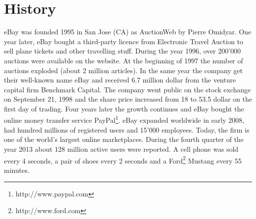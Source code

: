 \section{History}
eBay was founded 1995 in San Jose (CA) as AuctionWeb by Pierre Omidyar. One year later, eBay bought a third-party licence from Electronic Travel Auction to sell plane tickets and other travelling stuff. During the year 1996, over 200'000 auctions were available on the website. At the beginning of 1997 the number of auctions exploded (about 2 million articles). In the same year the company get their well-known name eBay and received 6.7 million dollar from the venture capital firm Benchmark Capital. The company went public on the stock exchange on September 21, 1998 and the share price increased from 18 to 53.5 dollar on the first day of trading. Four years later the growth continues and eBay bought the online money transfer service PayPal\footnote{http://www.paypal.com}. eBay expanded worldwide in early 2008, had hundred millions of registered users and 15'000 employees. Today, the firm is one of the world's largest online marketplaces. During the fourth quarter of the year 2013 about 128 million active users were reported. A cell phone was sold every 4 seconds, a pair of shoes every 2 seconds and a Ford\footnote{http://www.ford.com} Mustang every 55 minutes.

